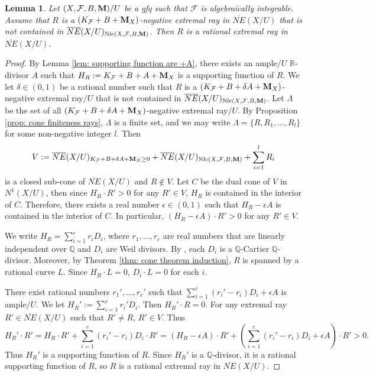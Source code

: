 \documentclass[11pt]{amsart}
\numberwithin{equation}{section}
\newcommand{\Mm}{{\bf{M}}}
\newcommand{\Qq}{\mathbb{Q}}
\newcommand{\Rr}{\mathbb{R}}
\newcommand{\Nlc}{\operatorname{Nlc}}
\newcommand{\Ff}{\mathcal{F}}
\newtheorem{lem}[thm]{Lemma}
\theoremstyle{definition}
\theoremstyle{definition}
\theoremstyle{definition}
\begin{document}
\begin{lem}\label{lem: gfq extremal ray rational}
Let $(X,\Ff,B,\Mm)/U$ be a gfq such that $\Ff$ is algebraically integrable. Assume that $R$ is a $(K_{\Ff}+B+\Mm_X)$-negative extremal ray in $\overline{NE}(X/U)$ that is not contained in $\overline{NE}(X/U)_{\Nlc(X,\Ff,B,\Mm)}$. Then $R$ is a rational extremal ray in $\overline{NE}(X/U)$.
\end{lem}
\begin{proof}
By Lemma \ref{lem: supporting function are +A}, there exists an ample$/U$ $\Rr$-divisor $A$ such that $H_R:=K_{\Ff}+B+A+\Mm_X$ is a supporting function of $R$. We let $\delta\in (0,1)$ be a rational number such that $R$ is a $(K_{\Ff}+B+\delta A+\Mm_X)$-negative extremal ray$/U$ that is not contained in $\overline{NE}(X/U)_{\Nlc(X,\Ff,B,\Mm)}$. Let $\Lambda$ be the set of all $(K_{\Ff}+B+\delta A+\Mm_X)$-negative extremal ray$/U$. By Proposition \ref{prop: cone finiteness rays}, $\Lambda$ is a finite set, and we may write $\Lambda=\{R,R_1,\dots,R_l\}$ for some non-negative integer $l$. Then 
$$V:=\overline{NE}(X/U)_{K_{\Ff}+B+\delta A+\Mm_X\geq 0}+\overline{NE}(X/U)_{\Nlc(X,\Ff,B,\Mm)}+\sum_{i=1}^lR_i$$
is a closed sub-cone of $\overline{NE}(X/U)$ and $R\not\in V$. Let $C$ be the dual cone of $V$ in $N^1(X/U)$, then since $H_R\cdot R'>0$ for any $R'\in V$, $H_R$ is contained in the interior of $C$. Therefore, there exists a real number $\epsilon\in (0,1)$ such that $H_R-\epsilon A$ is contained in the interior of $C$. In particular, $(H_R-\epsilon A)\cdot R'>0$ for any $R'\in V$.

We write $H_R=\sum_{i=1}^cr_iD_i$, where $r_1,\dots,r_c$ are real numbers that are linearly independent over $\Qq$ and $D_i$ are Weil divisors. By \cite[Lemma 5.3]{HLS19}, each $D_i$ is a $\Qq$-Cartier $\Qq$-divisor. Moreover, by Theorem \ref{thm: cone theorem induction}, $R$ is spanned by a rational curve $L$. Since $H_R\cdot L=0$, $D_i\cdot L=0$ for each $i$.

There exist rational numbers $r_1',\dots,r_c'$ such that $\sum_{i=1}^c(r_i'-r_i)D_i+\epsilon A$ is ample$/U$. We let $H_R':=\sum_{i=1}^cr_i'D_i$. Then $H_R'\cdot R=0$. For any extremal ray $R'\in\overline{NE}(X/U)$ such that $R'\not=R$, $R'\in V$. Thus
$$H_R'\cdot R'=H_R\cdot R'+\sum_{i=1}^c(r_i'-r_i)D_i\cdot R'=(H_R-\epsilon A)\cdot R'+\left(\sum_{i=1}^c(r_i'-r_i)D_i+\epsilon A\right)\cdot R'>0.$$
Thus $H_R'$ is a supporting function of $R$. Since $H_R'$ is a $\Qq$-divisor, it is a rational supporting function of $R$, so $R$ is a rational extremal ray in $\overline{NE}(X/U)$.
\end{proof}
\end{document}
